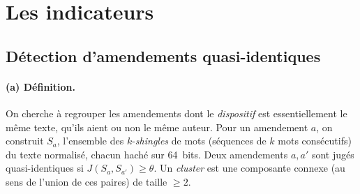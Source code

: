 \documentclass[11pt,a4paper]{article}
\begin{document}
\section{Les indicateurs}

\subsection{Détection d'amendements quasi-identiques}\label{sec:clusters}

\paragraph{(a) Définition.} On cherche à regrouper les amendements dont le
\emph{dispositif} est \og{}essentiellement le même texte\fg{}, qu'ils aient ou non le
même auteur. Pour un amendement $a$, on construit $S_a$, l'ensemble des
$k$-\emph{shingles} de mots (séquences de $k$ mots consécutifs) du texte normalisé,
chacun haché sur 64~bits. Deux amendements $a,a'$ sont jugés quasi-identiques si
$J(S_a,S_{a'})\ge\theta$. Un \emph{cluster} est une composante connexe (au sens de
l'union de ces paires) de taille $\ge 2$.
\end{document}
